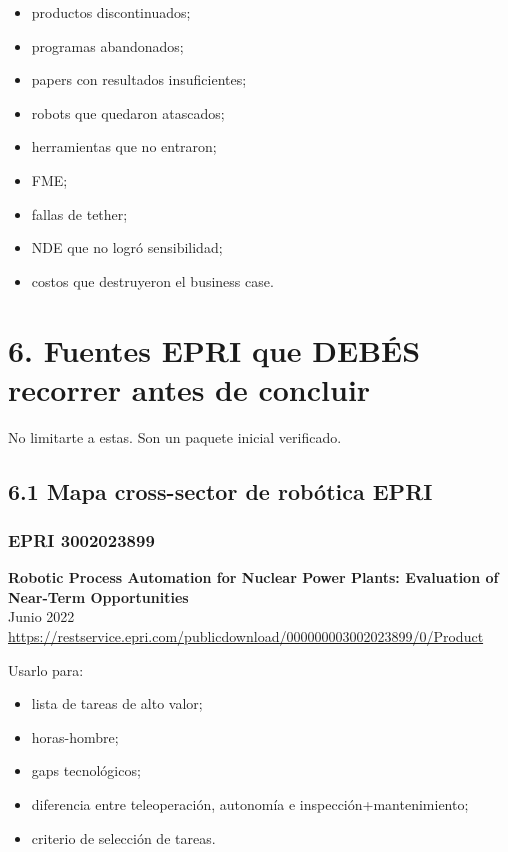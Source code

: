 \documentclass[11pt,a4paper]{article}
\begin{document}
\begin{itemize}
\item productos discontinuados;
\item programas abandonados;
\item papers con resultados insuficientes;
\item robots que quedaron atascados;
\item herramientas que no entraron;
\item FME;
\item fallas de tether;
\item NDE que no logró sensibilidad;
\item costos que destruyeron el business case.
\end{itemize}


\section*{6. Fuentes EPRI que DEBÉS recorrer antes de concluir}
No limitarte a estas. Son un paquete inicial verificado.


\subsection*{6.1 Mapa cross-sector de robótica EPRI}

\subsubsection*{EPRI 3002023899}
\textbf{Robotic Process Automation for Nuclear Power Plants: Evaluation of Near-Term Opportunities} \\
Junio 2022 \\
\url{https://restservice.epri.com/publicdownload/000000003002023899/0/Product}

Usarlo para:

\begin{itemize}
\item lista de tareas de alto valor;
\item horas-hombre;
\item gaps tecnológicos;
\item diferencia entre teleoperación, autonomía e inspección+mantenimiento;
\item criterio de selección de tareas.
\end{itemize}
\end{document}
